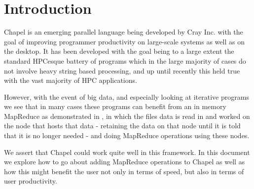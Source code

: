 
\section{Introduction}\label{s:intro}
Chapel is an emerging parallel language being developed by Cray Inc. with
the goal of improving programmer productivity on large-scale systems as
well as on the desktop. It has been developed with the goal being to a
large extent the  standard HPCesque battery of programs which in the large
majority of cases do not involve heavy string based processing, and up
until recently this held true with the vast majority of HPC applications.

However, with the event of big data, and especially looking at iterative
programs we see that in many cases these programs can
benefit from an in memory MapReduce as demonstrated in \cite{zaharia2010spark},
in which the files data is read in and worked on the node that hosts that data 
- retaining the data on that node until it is told that it is no longer needed - 
and doing MapReduce operations using these nodes.

We assert that Chapel could work quite well in this framework. In this
document we explore how to go about adding MapReduce operations to Chapel as 
well as how this might benefit the user not only in terms of speed, but also 
in terms of user productivity.

%
